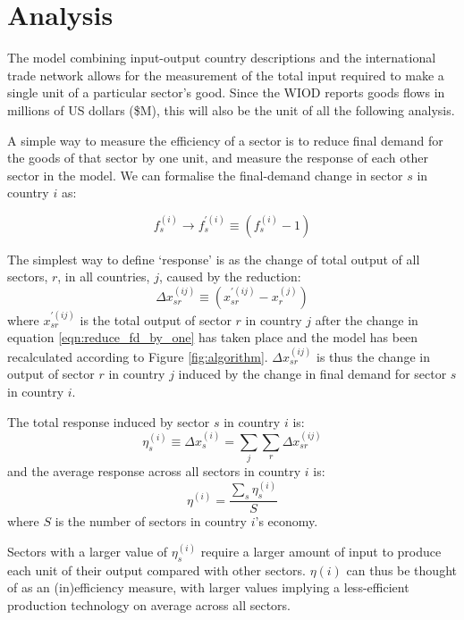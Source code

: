 \documentclass[a4paper]{article}
\begin{document}
\section{Analysis}\label{sec:analysis}
The model combining input-output country descriptions and the international trade network allows for the measurement of the total input required to make a single unit of a particular sector's good.
Since the WIOD reports goods flows in millions of US dollars (\$M), this will also be the unit of all the following analysis.

A simple way to measure the efficiency of a sector is to reduce final demand for the goods of that sector by one unit, and measure the response of each other sector in the model. We can formalise the final-demand change in sector $s$ in country $i$ as:

\begin{equation}\label{eqn:reduce_fd_by_one}
f_s^{(i)} \rightarrow f_s^{\prime (i)} \equiv (f_s^{(i)} - 1)
\end{equation}

The simplest way to define `response' is as the change of total output of all sectors, $r$, in all countries, $j$, caused by the reduction:
\begin{equation}
\Delta x_{sr}^{(ij)} \equiv (x_{sr}^{\prime(ij)} - x_r^{(j)})
\end{equation}
where $x_{sr}^{\prime(ij)}$ is the total output of sector $r$ in country $j$ after the change in equation \eqref{eqn:reduce_fd_by_one} has taken place and the model has been recalculated according to Figure \ref{fig:algorithm}.
$\Delta x_{sr}^{(ij)}$ is thus the change in output of sector $r$ in country $j$ induced by the change in final demand for sector $s$ in country $i$.

The total response induced by sector $s$ in country $i$ is:
\begin{equation}
\eta_s^{(i)} \equiv \Delta x_{s}^{(i)} = \sum_j \sum_r \Delta x_{sr}^{(ij)}
\end{equation}
and the average response across all sectors in country $i$ is:
\begin{equation}
\eta^{(i)} = \frac{\sum_s \eta_s^{(i)}}{S}
\end{equation}
where $S$ is the number of sectors in country $i$'s economy.

Sectors with a larger value of $\eta_s^{(i)}$ require a larger amount of input to produce each unit of their output compared with other sectors. $\eta{(i)}$ can thus be thought of as an (in)efficiency measure, with larger values implying a less-efficient production technology on average across all sectors.
\end{document}
